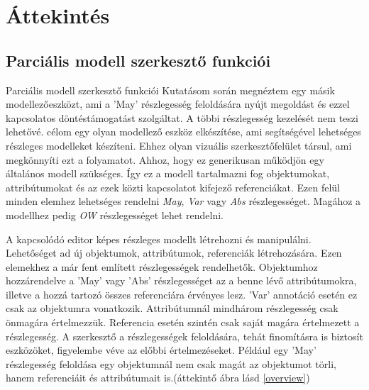\chapter{Áttekintés}\label{chapter:overview}

\section{Parciális modell szerkesztő funkciói}
Parciális modell szerkesztő funkciói
Kutatásom során megnéztem egy másik modellezőeszközt, ami a 'May' részlegesség feloldására nyújt megoldást és ezzel kapcsolatos döntéstámogatást szolgáltat\cite{Michalis}. A többi részlegesség kezelését nem teszi lehetővé. célom egy olyan modellező eszköz elkészítése, ami segítségével lehetséges részleges modelleket készíteni. Ehhez olyan vizuális szerkesztőfelület társul, ami megkönnyíti ezt a folyamatot. Ahhoz, hogy ez generikusan működjön egy általános modell szükséges. Így ez a modell tartalmazni fog objektumokat, attribútumokat és az ezek közti kapcsolatot kifejező referenciákat. Ezen felül minden elemhez lehetséges rendelni \textit{May}, \textit{Var} vagy \textit{Abs} részlegességet. Magához a modellhez pedig \textit{OW} részlegességet lehet rendelni.
\par
A kapcsolódó editor képes részleges modellt létrehozni és manipulálni. Lehetőséget ad új objektumok, attribútumok, referenciák létrehozására. Ezen elemekhez a már fent említett részlegességek rendelhetők. Objektumhoz hozzárendelve a 'May' vagy 'Abs' részlegességet az a benne lévő attribútumokra, illetve a hozzá tartozó összes referenciára érvényes lesz. 'Var' annotáció esetén ez csak az objektumra vonatkozik. Attribútumnál mindhárom részlegesség csak önmagára értelmezzük. Referencia esetén szintén csak saját magára értelmezett a részlegesség. A szerkesztő a részlegességek feloldására, tehát finomításra is biztosít eszközöket, figyelembe véve az előbbi értelmezéseket. Például egy 'May' részlegesség feloldása egy objektumnál nem csak magát az objektumot törli, hanem referenciáit és attribútumait is.(áttekintő ábra lásd \autoref{overview})



